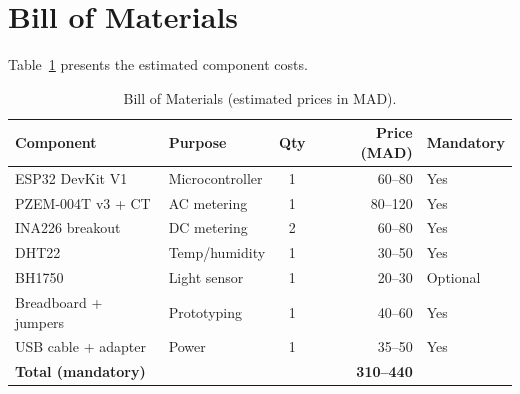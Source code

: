 \section{Bill of Materials}

Table~\ref{tab:bom} presents the estimated component costs.

\begin{table}[H]
\centering
\caption{Bill of Materials (estimated prices in MAD).}
\label{tab:bom}
\begin{tabular}{llcrl}
\toprule
\textbf{Component} & \textbf{Purpose} & \textbf{Qty} & \textbf{Price (MAD)} & \textbf{Mandatory} \\
\midrule
ESP32 DevKit V1 & Microcontroller & 1 & 60--80 & Yes \\
PZEM-004T v3 + CT & AC metering & 1 & 80--120 & Yes \\
INA226 breakout & DC metering & 2 & 60--80 & Yes \\
DHT22 & Temp/humidity & 1 & 30--50 & Yes \\
BH1750 & Light sensor & 1 & 20--30 & Optional \\
Breadboard + jumpers & Prototyping & 1 & 40--60 & Yes \\
USB cable + adapter & Power & 1 & 35--50 & Yes \\
\midrule
\multicolumn{3}{l}{\textbf{Total (mandatory)}} & \textbf{310--440} & \\
\bottomrule
\end{tabular}
\end{table}
